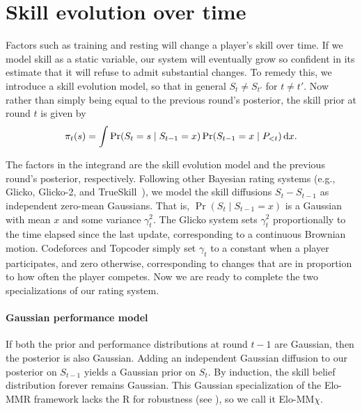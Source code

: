 \section{Skill evolution over time}
\label{sec:skill-drift}

Factors such as training and resting will change a player's skill over time. If we model skill as a static variable, our system will eventually grow so confident in its estimate that it will refuse to admit substantial changes. To remedy this, we introduce a skill evolution model, so that in general $S_t \neq S_{t'}$ for $t \neq t'$. Now rather than simply being equal to the previous round's posterior, the skill prior at round $t$ is given by
\begin{equation}
\label{eq:drift}
\pi_t(s) = \int \Pr(S_t = s \mid S_{t-1} = x) \Pr(S_{t-1} = x \mid P_{<t}) \,\mathrm{d}x.
\end{equation}

The factors in the integrand are the skill evolution model and the previous round's posterior, respectively. Following other Bayesian rating systems (e.g., Glicko, Glicko-2, and TrueSkill~\cite{G99, G12, HMG06}), we model the skill diffusions $S_t-S_{t-1}$ as independent zero-mean Gaussians. That is, $\Pr(S_t \mid S_{t-1}=x)$ is a Gaussian with mean $x$ and some variance $\gamma_t^2$. The Glicko system sets $\gamma_t^2$ proportionally to the time elapsed since the last update, corresponding to a continuous Brownian motion. Codeforces and Topcoder simply set $\gamma_t$ to a constant when a player participates, and zero otherwise, corresponding to changes that are in proportion to how often the player competes. Now we are ready to complete the two specializations of our rating system.

\paragraph{Gaussian performance model}
If both the prior and performance distributions at round $t-1$ are Gaussian, then the posterior is also Gaussian. Adding an independent Gaussian diffusion to our posterior on $S_{t-1}$ yields a Gaussian prior on $S_t$. By induction, the skill belief distribution forever remains Gaussian. This Gaussian specialization of the Elo-MMR framework lacks the R for robustness (see ), so we call it Elo-MM$\chi$.


